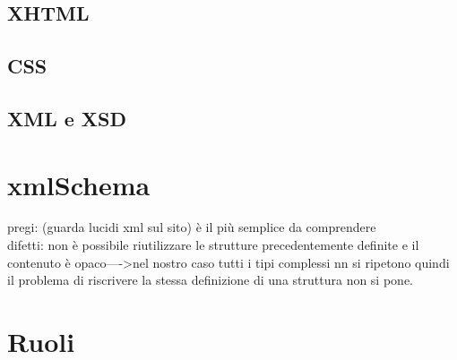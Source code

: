 \documentclass[12pt]{article}
\begin{document}
	\subsection{XHTML}
	\subsection{CSS}
	\subsection{XML e XSD}

\section{xmlSchema}

pregi: (guarda lucidi xml sul sito)
è il più semplice da comprendere\\
difetti: non è possibile riutilizzare le strutture precedentemente definite e il contenuto è opaco---->nel nostro caso tutti i tipi complessi nn si ripetono quindi il problema di riscrivere la stessa definizione di una struttura non si pone.




\section{Ruoli}

	


\newpage
\end{document}
